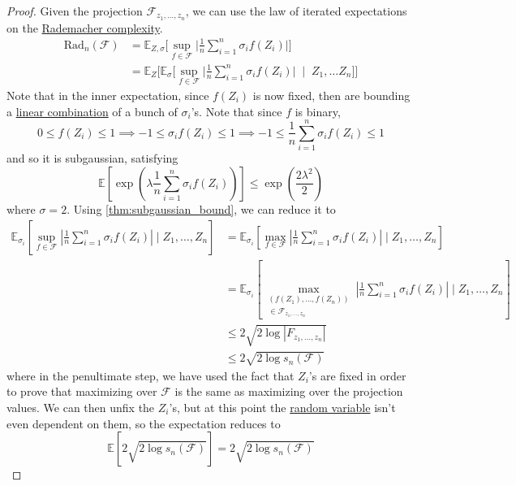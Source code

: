   \begin{proof}
    Given the projection $\mathcal{F}_{z_1, \ldots, z_n}$, we can use the law of iterated expectations on the \hyperref[def:rademacher-complexity]{Rademacher complexity}. 
    \begin{align}
      \mathrm{Rad}_n (\mathcal{F}) & = \mathbb{E}_{Z, \sigma} \bigg[ \sup_{f \in \mathcal{F}} \bigg| \frac{1}{n} \sum_{i=1}^n \sigma_i f(Z_i) \bigg| \bigg] \\
                                   & = \mathbb{E}_{Z} \bigg[ \mathbb{E}_{\sigma} \bigg[ \sup_{f \in \mathcal{F}} \bigg| \frac{1}{n} \sum_{i=1}^n \sigma_i f(Z_i) \bigg| \; \mid \; Z_1, \ldots Z_n \bigg] \bigg] 
    \end{align}
    Note that in the inner expectation, since $f(Z_i)$ is now fixed, then are bounding a \hyperref[lin-def:linear-combination]{linear combination} of a bunch of $\sigma_i$'s. Note that since $f$ is binary, 
    \begin{equation}
      0 \leq f(Z_i) \leq 1 \implies -1 \leq \sigma_i f(Z_i)\leq 1 \implies -1 \leq \frac{1}{n} \sum_{i=1}^n \sigma_i f(Z_i) \leq 1 
    \end{equation}
    and so it is subgaussian, satisfying 
    \begin{equation}
      \mathbb{E}\left[ \exp \left( \lambda \frac{1}{n} \sum_{i=1}^n \sigma_i f(Z_i) \right)\right] \leq \exp \left( \frac{2 \lambda^2}{2} \right)
    \end{equation}
    where $\sigma = 2$. Using \ref{thm:subgaussian_bound}, we can reduce it to 
    \begin{align}
      \mathbb{E}_{\sigma_i} \left[ \sup_{f \in \mathcal{F}} \left| \frac{1}{n} \sum_{i=1}^n \sigma_i f(Z_i) \right| \mid Z_1, \ldots, Z_n \right] 
      & = \mathbb{E}_{\sigma_i} \left[ \max_{f \in \mathcal{F}} \left| \frac{1}{n} \sum_{i=1}^n \sigma_i f(Z_i) \right| \mid Z_1, \ldots, Z_n \right] \\
      & = \mathbb{E}_{\sigma_i} \left[ \max_{\substack{(f(Z_1), \ldots, f(Z_n)) \\ \in \mathcal{F}_{z_1, \ldots, z_n}}} \left| \frac{1}{n} \sum_{i=1}^n \sigma_i f(Z_i) \right| \mid Z_1, \ldots, Z_n \right] \\
      & \leq 2 \sqrt{2 \log{| F_{z_1, \ldots, z_n}|}} \\
      & \leq 2 \sqrt{2 \log{s_n (\mathcal{F})}}
    \end{align}
    where in the penultimate step, we have used the fact that $Z_i$'s are fixed in order to prove that maximizing over $\mathcal{F}$ is the same as maximizing over the projection values. We can then unfix the $Z_i$'s, but at this point the \hyperref[prob-def:random-variable]{random variable} isn't even dependent on them, so the expectation reduces to 
    \begin{equation}
      \mathbb{E} \left[ 2 \sqrt{2 \log{s_n (\mathcal{F})}} \right] = 2 \sqrt{2 \log{s_n (\mathcal{F})}}
    \end{equation}
  \end{proof}

